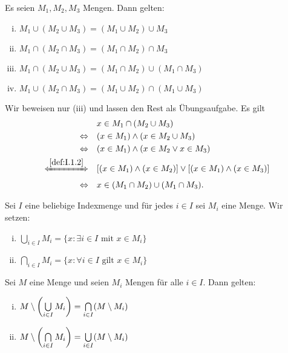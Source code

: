 \begin{satz}
	\label{satz:I.2.6}
	Es seien $M_1, M_2, M_3$ Mengen.
	Dann gelten:
	\begin{enumerate}[(i)]
		\item $M_1 \cup (M_2 \cup M_3) = (M_1 \cup M_2) \cup M_3$
		\item $M_1 \cap (M_2 \cap M_3) = (M_1 \cap M_2) \cap M_3$
		\item $M_1 \cap (M_2 \cup M_3) = (M_1 \cap M_2) \cup (M_1 \cap M_3)$
		\item $M_1 \cup (M_2 \cap M_3) = (M_1 \cup M_2) \cap (M_1 \cup M_3)$
	\end{enumerate}
\end{satz}

\begin{beweis}
	Wir beweisen nur (iii) und lassen den Rest als Übungsaufgabe.
	Es gilt
	\begin{align*}
		&x \in M_1 \cap (M_2 \cup M_3) \\
		\Leftrightarrow \quad &(x \in M_1) \wedge (x \in M_2 \cup M_3) \\
		\Leftrightarrow \quad &(x \in M_1) \wedge (x \in M_2 \vee x \in M_3) \\
		\xLeftrightarrow{\ref{def:I.1.2}} \quad &[(x \in M_1) \wedge (x \in M_2)] \vee [(x \in M_1) \wedge (x \in M_3)] \\
		\Leftrightarrow \quad &x \in (M_1 \cap M_2) \cup (M_1 \cap M_3).
	\end{align*}
\end{beweis}

\begin{definition}
	\label{def:I.2.7}
	Sei $I$ eine beliebige Indexmenge und für jedes $i \in I$ sei $M_i$ eine Menge.
	Wir setzen:
	
	\begin{enumerate}[(i)]
		\item $\bigcup\limits_{i \in I} M_i = \{x : \exists i \in I \text{ mit } x \in M_i\}$
		\item $\bigcap\limits_{i \in I} M_i = \{x : \forall i \in I \text{ gilt } x \in M_i\}$
	\end{enumerate}
\end{definition}

\begin{satz}
	\label{satz:I.2.8}
	Sei $M$ eine Menge und seien $M_i$ Mengen für alle $i \in I$.
	Dann gelten: 
	\begin{enumerate}[(i)]
		\item $M \setminus \left(\bigcup\limits_{i\in I} M_i\right) = \bigcap\limits_{i \in I} (M \setminus M_i)$
		\item $M \setminus \left(\bigcap\limits_{i\in I} M_i\right) = \bigcup\limits_{i \in I} (M \setminus M_i)$
	\end{enumerate}
\end{satz}

